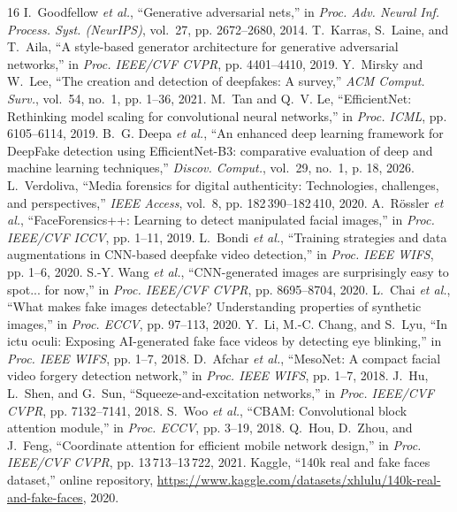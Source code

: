 \documentclass[conference]{IEEEtran}
\begin{document}
\begin{thebibliography}{16}
 I.~Goodfellow \emph{et al.}, ``Generative adversarial nets,'' in \emph{Proc. Adv. Neural Inf. Process. Syst. (NeurIPS)}, vol.~27, pp. 2672--2680, 2014.
 T.~Karras, S.~Laine, and T.~Aila, ``A style-based generator architecture for generative adversarial networks,'' in \emph{Proc. IEEE/CVF CVPR}, pp. 4401--4410, 2019.
 Y.~Mirsky and W.~Lee, ``The creation and detection of deepfakes: A survey,'' \emph{ACM Comput. Surv.}, vol.~54, no.~1, pp. 1--36, 2021.
 M.~Tan and Q.~V. Le, ``EfficientNet: Rethinking model scaling for convolutional neural networks,'' in \emph{Proc. ICML}, pp. 6105--6114, 2019.
 B.~G. Deepa \emph{et al.}, ``An enhanced deep learning framework for DeepFake detection using EfficientNet-B3: comparative evaluation of deep and machine learning techniques,'' \emph{Discov. Comput.}, vol.~29, no.~1, p. 18, 2026.
 L.~Verdoliva, ``Media forensics for digital authenticity: Technologies, challenges, and perspectives,'' \emph{IEEE Access}, vol.~8, pp. 182\,390--182\,410, 2020.
 A.~R{\"o}ssler \emph{et al.}, ``FaceForensics++: Learning to detect manipulated facial images,'' in \emph{Proc. IEEE/CVF ICCV}, pp. 1--11, 2019.
 L.~Bondi \emph{et al.}, ``Training strategies and data augmentations in CNN-based deepfake video detection,'' in \emph{Proc. IEEE WIFS}, pp. 1--6, 2020.
 S.-Y. Wang \emph{et al.}, ``CNN-generated images are surprisingly easy to spot... for now,'' in \emph{Proc. IEEE/CVF CVPR}, pp. 8695--8704, 2020.
 L.~Chai \emph{et al.}, ``What makes fake images detectable? Understanding properties of synthetic images,'' in \emph{Proc. ECCV}, pp. 97--113, 2020.
 Y.~Li, M.-C. Chang, and S.~Lyu, ``In ictu oculi: Exposing AI-generated fake face videos by detecting eye blinking,'' in \emph{Proc. IEEE WIFS}, pp. 1--7, 2018.
 D.~Afchar \emph{et al.}, ``MesoNet: A compact facial video forgery detection network,'' in \emph{Proc. IEEE WIFS}, pp. 1--7, 2018.
 J.~Hu, L.~Shen, and G.~Sun, ``Squeeze-and-excitation networks,'' in \emph{Proc. IEEE/CVF CVPR}, pp. 7132--7141, 2018.
 S.~Woo \emph{et al.}, ``CBAM: Convolutional block attention module,'' in \emph{Proc. ECCV}, pp. 3--19, 2018.
 Q.~Hou, D.~Zhou, and J.~Feng, ``Coordinate attention for efficient mobile network design,'' in \emph{Proc. IEEE/CVF CVPR}, pp. 13\,713--13\,722, 2021.
 Kaggle, ``140k real and fake faces dataset,'' online repository, \url{https://www.kaggle.com/datasets/xhlulu/140k-real-and-fake-faces}, 2020.
\end{thebibliography}
\end{document}
